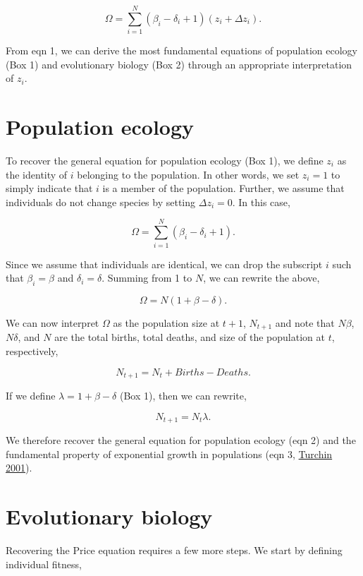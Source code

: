 \documentclass[
]{article}
\begin{document}
\[\Omega = \sum_{i=1}^{N} \left(\beta_{i} - \delta_{i} + 1 \right)\left(z_{i} + \Delta z_{i} \right).
\tag{1}
\]

From eqn 1, we can derive the most fundamental equations of population
ecology (Box 1) and evolutionary biology (Box 2) through an appropriate
interpretation of \(z_{i}\).

\hypertarget{population-ecology}{%
\section{Population ecology}\label{population-ecology}}

To recover the general equation for population ecology (Box 1), we
define \(z_{i}\) as the identity of \(i\) belonging to the population.
In other words, we set \(z_{i} = 1\) to simply indicate that \(i\) is a
member of the population. Further, we assume that individuals do not
change species by setting \(\Delta z_{i} = 0\). In this case,

\[\Omega = \sum_{i=1}^{N} \left(\beta_{i} - \delta_{i} + 1 \right).\]

Since we assume that individuals are identical, we can drop the
subscript \(i\) such that \(\beta_{i} = \beta\) and
\(\delta_{i} = \delta\). Summing from 1 to \(N\), we can rewrite the
above,

\[\Omega = N\left(1 + \beta - \delta \right).\]

We can now interpret \(\Omega\) as the population size at \(t+1\),
\(N_{t+1}\) and note that \(N\beta\), \(N\delta\), and \(N\) are the
total births, total deaths, and size of the population at \(t\),
respectively,

\[N_{t+1} = N_{t} + Births - Deaths.
\tag{2}
\]

If we define \(\lambda = 1 + \beta - \delta\) (Box 1), then we can
rewrite,

\[N_{t+1} = N_{t}\lambda.
\tag{3}
\]

We therefore recover the general equation for population ecology (eqn 2)
and the fundamental property of exponential growth in populations (eqn
3, \protect\hyperlink{ref-Turchin2001}{Turchin 2001}).

\hypertarget{evolutionary-biology}{%
\section{Evolutionary biology}\label{evolutionary-biology}}

Recovering the Price equation requires a few more steps. We start by
defining individual fitness,
\end{document}
